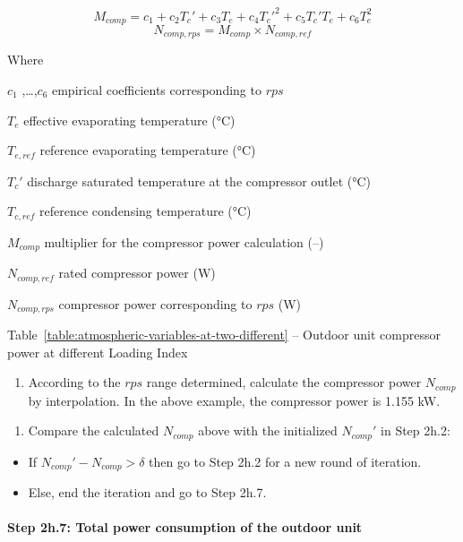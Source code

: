 \[M_{comp} = c_1+c_2{T_c}'+c_3T_e+c_4{T_c}'^2+c_5{T_c}'T_e+c_6T_e^2\] \[N_{comp,rps} = M_{comp} \times N_{comp,ref}\]

Where

\(c_1\) ,\ldots{},\(c_6\) empirical coefficients corresponding to \(rps\)

\(T_e\) effective evaporating temperature (°C)

\(T_{e,ref}\) reference evaporating temperature (°C)

\({T_c}'\) discharge saturated temperature at the compressor outlet (°C)

\(T_{c,ref}\) reference condensing temperature (°C)

\(M_{comp}\) multiplier for the compressor power calculation (--)

\(N_{comp,ref}\) rated compressor power (W)

\(N_{comp,rps}\) compressor power corresponding to \(rps\) (W)

Table~\ref{table:atmospheric-variables-at-two-different} -- Outdoor unit compressor power at different Loading Index



\begin{enumerate}
\def\labelenumi{\alph{enumi}.}
\setcounter{enumi}{1}
\tightlist
\item
  According to the \(rps\) range determined, calculate the compressor power \(N_{comp}\) by interpolation. In the above example, the compressor power is 1.155 kW. 
\end{enumerate}

\begin{enumerate}
\def\labelenumi{(\arabic{enumi})}
\setcounter{enumi}{1}
\tightlist
\item
  Compare the calculated \(N_{comp}\) above with the initialized \({N_{comp}}'\) in Step 2h.2:
\end{enumerate}

\begin{itemize}
\item
  If \({N_{comp}}'-N_{comp}>\delta\) then go to Step 2h.2 for a new round of iteration.
\item
  Else, end the iteration and go to Step 2h.7.
\end{itemize}

\paragraph{Step 2h.7: Total power consumption of the outdoor unit}\label{step-2h.7-total-power-consumption-of-the-outdoor-unit}

